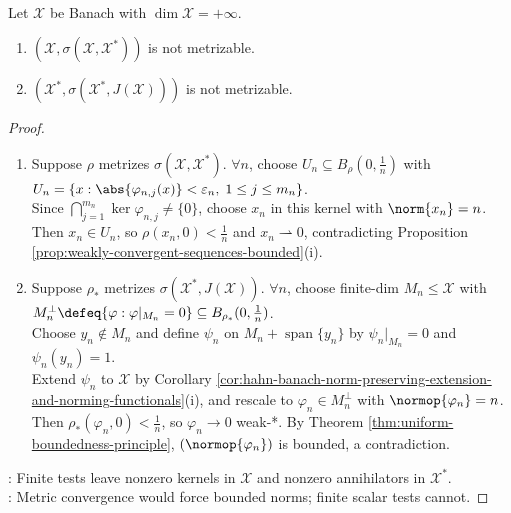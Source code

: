 \begin{theorem} \label{thm:whole-weak-topologies-nonmetrizable} \\
Let $\mathcal{X}$ be Banach with $\dim\mathcal{X}=+\infty$.
\begin{enumerate}[label=(\roman*)]
\setlength{\itemsep}{0pt}
\item $(\mathcal{X},\sigma(\mathcal{X},\mathcal{X}^*))$ is not metrizable.
\item $(\mathcal{X}^*,\sigma(\mathcal{X}^*,J(\mathcal{X})))$ is not metrizable.
\end{enumerate}
\begin{proof}
\begin{enumerate}[label=(\roman*)]
\setlength{\itemsep}{0pt}
\item Suppose $\rho$ metrizes $\sigma(\mathcal{X},\mathcal{X}^*)$. $\forall n$, choose $U_n\subseteq B_\rho(0,\frac1n)$ with $U_n=\{x:\abs{\varphi_{n,j}(x)}<\varepsilon_n,\;1\leq j\leq m_n\}$.\\
Since $\bigcap_{j=1}^{m_n}\ker\varphi_{n,j}\neq\{0\}$, choose $x_n$ in this kernel with $\norm{x_n}=n$.\\
Then $x_n\in U_n$, so $\rho(x_n,0)<\frac1n$ and $x_n\rightharpoonup0$, contradicting Proposition \ref{prop:weakly-convergent-sequences-bounded}(i).
\item Suppose $\rho_*$ metrizes $\sigma(\mathcal{X}^*,J(\mathcal{X}))$. $\forall n$, choose finite-dim $M_n\leq\mathcal X$ with $M_n^\perp\defeq\{\varphi:\varphi|_{M_n}=0\}\subseteq B_{\rho_*}(0,\frac1n)$.\\
Choose $y_n\notin M_n$ and define $\psi_n$ on $M_n+\operatorname{span}\{y_n\}$ by $\psi_n|_{M_n}=0$ and $\psi_n(y_n)=1$.\\
Extend $\psi_n$ to $\mathcal{X}$ by Corollary \ref{cor:hahn-banach-norm-preserving-extension-and-norming-functionals}(i), and rescale to $\varphi_n\in M_n^\perp$ with $\normop{\varphi_n}=n$.\\
Then $\rho_*(\varphi_n,0)<\frac1n$, so $\varphi_n\to0$ weak-*. By Theorem \ref{thm:uniform-boundedness-principle}, $(\normop{\varphi_n})$ is bounded, a contradiction.
\end{enumerate}
: Finite tests leave nonzero kernels in $\mathcal{X}$ and nonzero annihilators in $\mathcal{X}^*$.\\
: Metric convergence would force bounded norms; finite scalar tests cannot.
\end{proof}
\end{theorem}

